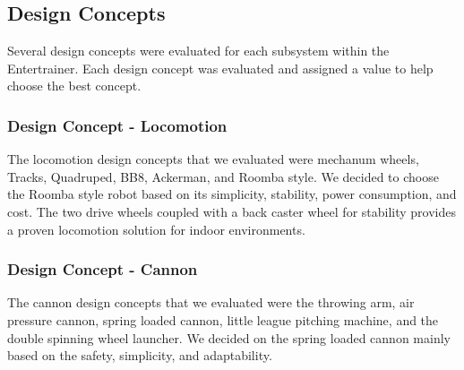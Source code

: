 \documentclass[11pt]{article}
\begin{document}
\subsection{Design Concepts}
Several design concepts were evaluated for each subsystem within the Entertrainer. Each design concept was evaluated and assigned a value to help choose the best concept. 
\subsubsection{Design Concept - Locomotion}
The locomotion design concepts that we evaluated were mechanum wheels, Tracks, Quadruped, BB8, Ackerman, and Roomba style. We decided to choose the Roomba style robot based on its simplicity, stability, power consumption, and cost. The two drive wheels coupled with a back caster wheel for stability provides a proven locomotion solution for indoor environments. 
\subsubsection{Design Concept - Cannon}
The cannon design concepts that we evaluated were the throwing arm, air pressure cannon, spring loaded cannon, little league pitching machine, and the double spinning wheel launcher. We decided on the spring loaded cannon mainly based on the safety, simplicity, and adaptability. 
\end{document}
